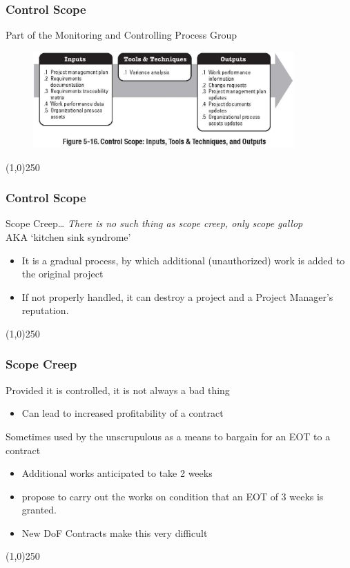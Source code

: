 \begin{frame}
\frametitle{Control Scope}{Part of the Monitoring and Controlling Process Group}
\begin{figure}
	\centering
		\includegraphics[width = 10cm]{images/Fig5-16.jpg}
	\label{fig:5-16}
\end{figure}
\end{frame}\begin{center}\line(1,0){250}\end{center}



\begin{frame}
\frametitle{Control Scope}
Scope Creep\ldots
\emph{There is no such thing as scope creep, only scope gallop} \smiley{}\\
AKA `kitchen sink syndrome' \smiley{}\\
\begin{itemize}
	\item It is a gradual process, by which additional (unauthorized) work is added to the original project 
	\item If not properly handled, it can destroy a project and a Project Manager's reputation.
\end{itemize}
\end{frame}\begin{center}\line(1,0){250}\end{center}



\begin{frame}
\frametitle{Scope Creep}
Provided it is controlled, it is not always a bad thing
\begin{itemize}
	\item Can lead to increased profitability of a contract
\end{itemize}
Sometimes used by the unscrupulous as  a means to bargain for an EOT to a contract
\begin{itemize}
	\item Additional works anticipated to take 2 weeks
	\item propose to carry out the works on condition that an EOT of 3 weeks is granted.
	\item New DoF Contracts make this very difficult
\end{itemize}
\end{frame}\begin{center}\line(1,0){250}\end{center}



